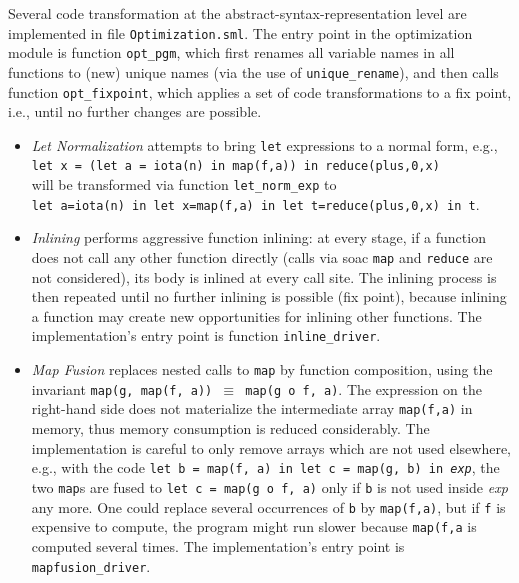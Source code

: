\documentclass[a4paper,11pt]{article}
\begin{document}
Several code transformation at the abstract-syntax-representation level 
are implemented in file {\tt Optimization.sml}.
The entry point in the optimization module is function {\tt opt\_pgm}, which
first renames all variable names in all functions to (new) unique names 
(via the use of {\tt unique\_rename}), and then calls function {\tt opt\_fixpoint},
which applies a set of code transformations to a fix point, i.e., until no further
changes are possible.
%
\begin{itemize}
    \item {\em Let Normalization} attempts to bring {\tt let} expressions 
            to a normal form, e.g., \\
            {\tt let x = (let a = iota(n) in map(f,a)) in reduce(plus,0,x)} \\
            will be transformed via function {\tt let\_norm\_exp} to \\
            {\tt let~a=iota(n)~in~let~x=map(f,a)~in~let~t=reduce(plus,0,x)~in~t}.
    \item {\em Inlining} performs aggressive function inlining: at every stage,
            if a function does not call any other function directly
            (calls via {\sc soac} {\tt map} and {\tt reduce}
            are not considered), its body is inlined at every call site.
            The inlining process is then repeated until no further inlining is 
            possible (fix point), because inlining a
            function may create new opportunities for inlining other functions. 
            The implementation's entry point is function {\tt inline\_driver}. 
    \item {\em Map Fusion} replaces nested calls to \texttt{map} by function composition,
    	    using the invariant
            {\tt map(g, map(f, a)) $\equiv$ map(g o f, a)}. The expression on the right-hand
            side does not materialize the intermediate array {\tt map(f,a)} in memory, 
            thus memory consumption is reduced considerably.
%
            The implementation is careful to only remove arrays which
            are not used elsewhere, e.g., with the code
            {\tt let b = map(f, a) in let c = map(g, b) in \emph{exp}}, the two
            {\tt map}s are fused to {\tt let c = map(g o f, a)} only if
            {\tt b} is not used inside \emph{exp} any more. 
            One could replace several occurrences of {\tt b} by \texttt{map(f,a)},
            but if {\tt f} is expensive to compute, the program
            might run slower because {\tt map(f,a} is computed several times.
            The implementation's entry point
            is {\tt mapfusion\_driver}. 
\end{itemize}
\end{document}
